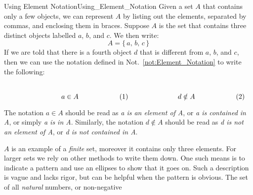     \begin{fexample}{Using Element Notation}{Using_Element_Notation}
        Given a set $A$ that contains only a few objects, we can represent $A$
        by listing out the elements, separated by commas, and enclosing them in
        braces. Suppose $A$ is the set that contains three distinct objects
        labelled $a$, $b$, and $c$. We then write:
        \begin{equation}
            A=\big\{\,a,\,b,\,c\,\big\}
        \end{equation}
        If we are told that there is a fourth object $d$ that is different from
        $a$, $b$, and $c$, then we can use the notation defined in
        Not.~\ref{not:Element_Notation} to write the following:
        \par
        \begin{subequations}
            \begin{minipage}[b]{0.49\textwidth}
                \centering
                \begin{equation}
                    a\in{A}
                \end{equation}
            \end{minipage}
            \hfill
            \begin{minipage}[b]{0.49\textwidth}
                \centering
                \begin{equation}
                    d\notin{A}
                \end{equation}
            \end{minipage}
        \end{subequations}
        \par\vspace{2.5ex}
        The notation $a\in{A}$ should be read as \textit{a is an element of A},
        or \textit{a is contained in A}, or simply \textit{a is in A}.
        Similarly, the notation $d\notin{A}$ should be read as
        \textit{d is not an element of A}, or \textit{d is not contained in A}.
        \par\hfill\par
        $A$ is an example of a \textit{finite} set, moreover
        it contains only three elements. For larger sets we rely on other
        methods to write them down. One such means is to indicate a pattern and
        use an ellipses to show that it goes on. Such a description is vague and
        lacks rigor, but can be helpful when the pattern is obvious. The set of
        all \textit{natural} numbers, or non-negative

\end{fexample}
